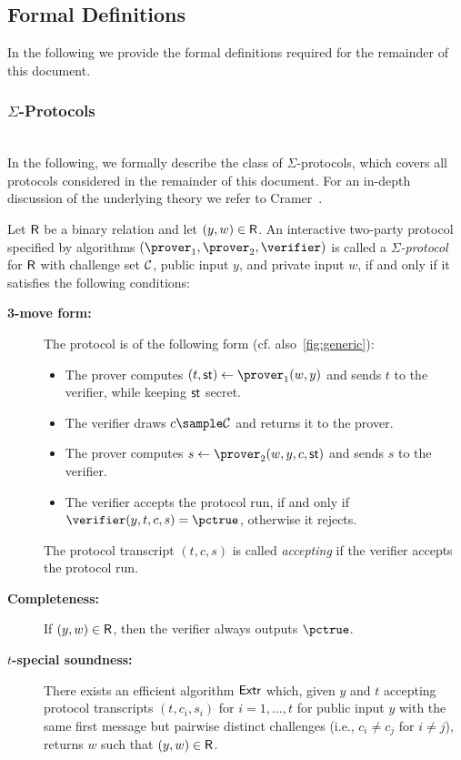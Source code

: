 \documentclass[runningheads]{llncs}
\begin{document}
\subsection{Formal Definitions}
  In the following we provide the formal definitions required for the remainder of this document.

\subsubsection{$\Sigma$-Protocols}~\\

In the following, we formally describe the class of $\Sigma$-protocols, which covers all protocols considered in the remainder of this document.
 For an in-depth discussion of the underlying theory we refer to Cramer~\cite{cramer97}.
\begin{definition}\label{def:sigma}
  Let $\mathsf{R}$ be a binary relation and let $(y,w)\in\mathsf{R}$.
  An interactive two-party protocol specified by algorithms $(\prover_1,\prover_2,\verifier)$ is called a \emph{$\Sigma$-protocol} for $\mathsf{R}$ with challenge set $\mathcal{C}$, public input $y$, and private input $w$, if and only if it satisfies the following conditions:
  \begin{description}
    \item[\bf 3-move form:]
      The protocol is of the following form (cf. also~\cref{fig:generic}):
      \begin{itemize}
        \item
          The prover computes $(t,\st) \gets \prover_1(w,y)$ and sends $t$ to the verifier, while keeping $\mathsf{st}$ secret.
        \item
          The verifier draws $c\sample\CS$ and returns it to the prover.
        \item
          The prover computes $s\gets\prover_2(w,y,c,\st)$ and sends $s$ to the verifier.
        \item
          The verifier accepts the protocol run, if and only if $\verifier(y,t,c,s)=\accept$, otherwise it rejects.
      \end{itemize}
      The protocol transcript $(t,c,s)$ is called \emph{accepting} if the verifier accepts the protocol run.
    \item[\bf Completeness:]
      If $(y,w)\in\mathsf{R}$, then the verifier always outputs $\accept$.
    \item[\bf $t$-special soundness:]
      There exists an efficient algorithm $\mathsf{Extr}$ which, given $y$ and $t$ accepting protocol transcripts $(t,c_i,s_i)$ for $i=1,\dots,t$ for public input $y$ with the same first message but pairwise distinct challenges (i.e., $c_i\ne c_j$ for $i\ne j$), returns $w$ such that $(y,w)\in\mathsf{R}$.

\end{description}
\end{definition}
\end{document}
